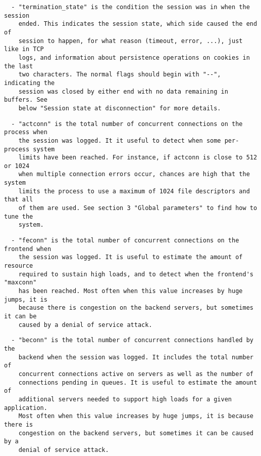 \begin{verbatim}
  - "termination_state" is the condition the session was in when the session
    ended. This indicates the session state, which side caused the end of
    session to happen, for what reason (timeout, error, ...), just like in TCP
    logs, and information about persistence operations on cookies in the last
    two characters. The normal flags should begin with "--", indicating the
    session was closed by either end with no data remaining in buffers. See
    below "Session state at disconnection" for more details.
\end{verbatim}

\begin{verbatim}
  - "actconn" is the total number of concurrent connections on the process when
    the session was logged. It it useful to detect when some per-process system
    limits have been reached. For instance, if actconn is close to 512 or 1024
    when multiple connection errors occur, chances are high that the system
    limits the process to use a maximum of 1024 file descriptors and that all
    of them are used. See section 3 "Global parameters" to find how to tune the
    system.
\end{verbatim}

\begin{verbatim}
  - "feconn" is the total number of concurrent connections on the frontend when
    the session was logged. It is useful to estimate the amount of resource
    required to sustain high loads, and to detect when the frontend's "maxconn"
    has been reached. Most often when this value increases by huge jumps, it is
    because there is congestion on the backend servers, but sometimes it can be
    caused by a denial of service attack.
\end{verbatim}

\begin{verbatim}
  - "beconn" is the total number of concurrent connections handled by the
    backend when the session was logged. It includes the total number of
    concurrent connections active on servers as well as the number of
    connections pending in queues. It is useful to estimate the amount of
    additional servers needed to support high loads for a given application.
    Most often when this value increases by huge jumps, it is because there is
    congestion on the backend servers, but sometimes it can be caused by a
    denial of service attack.
\end{verbatim}

